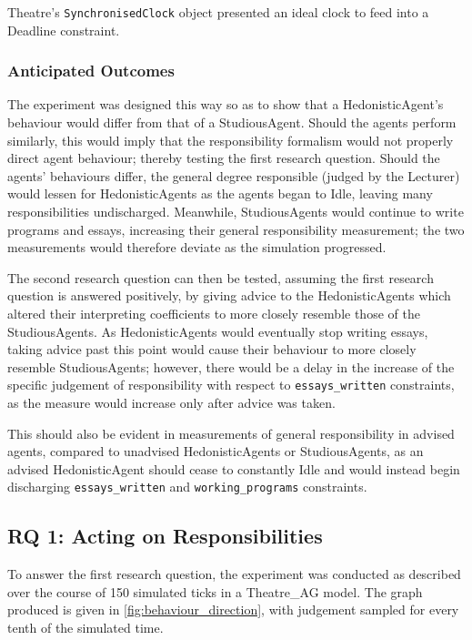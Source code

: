 Theatre's \texttt{SynchronisedClock} object presented an ideal clock to feed into a Deadline constraint.

\subsubsection{Anticipated Outcomes}

The experiment was designed this way so as to show that a HedonisticAgent's behaviour would differ from that of a StudiousAgent. Should the agents perform similarly, this would imply that the responsibility formalism would not properly direct agent behaviour; thereby testing the first research question. Should the agents' behaviours differ, the general degree responsible (judged by the Lecturer) would lessen for HedonisticAgents as the agents began to Idle, leaving many responsibilities undischarged. Meanwhile, StudiousAgents would continue to write programs and essays, increasing their general responsibility measurement; the two measurements would therefore deviate as the simulation progressed.\par

The second research question can then be tested, assuming the first research question is answered positively, by giving advice to the HedonisticAgents which altered their interpreting coefficients to more closely resemble those of the StudiousAgents. As HedonisticAgents would eventually stop writing essays, taking advice past this point would cause their behaviour to more closely resemble StudiousAgents; however, there would be a delay in the increase of the specific judgement of responsibility with respect to \texttt{essays\_written} constraints, as the measure would increase only after advice was taken.\par

This should also be evident in measurements of general responsibility in advised agents, compared to unadvised HedonisticAgents or StudiousAgents, as an advised HedonisticAgent should cease to constantly Idle and would instead begin discharging \texttt{essays\_written} and \texttt{working\_programs} constraints.\par

\subsection{RQ 1: Acting on Responsibilities}
To answer the first research question, the experiment was conducted as described over the course of 150 simulated ticks in a Theatre\_AG model. The graph produced is given in \cref{fig:behaviour_direction}, with judgement sampled for every tenth of the simulated time.

